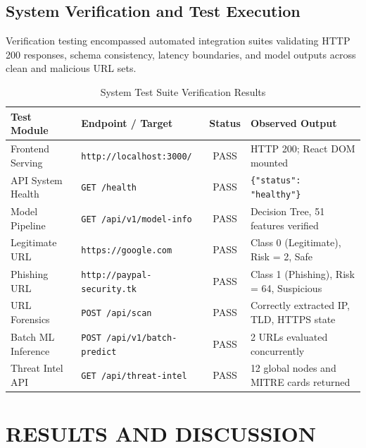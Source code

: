 \documentclass[BTech]{srmuthesis}
\begin{document}
\section{System Verification and Test Execution}
Verification testing encompassed automated integration suites validating HTTP 200 responses, schema consistency, latency boundaries, and model outputs across clean and malicious URL sets.

\begin{table}[htpb]
\centering
\caption{System Test Suite Verification Results}
\label{tab:test_results}
\begin{tabular}{|l|l|c|l|}
\hline
\textbf{Test Module} & \textbf{Endpoint / Target} & \textbf{Status} & \textbf{Observed Output} \\
\hline
Frontend Serving & \texttt{http://localhost:3000/} & PASS & HTTP 200; React DOM mounted \\
\hline
API System Health & \texttt{GET /health} & PASS & \texttt{\{"status": "healthy"\}} \\
\hline
Model Pipeline & \texttt{GET /api/v1/model-info} & PASS & Decision Tree, 51 features verified \\
\hline
Legitimate URL & \texttt{https://google.com} & PASS & Class 0 (Legitimate), Risk = 2, Safe \\
\hline
Phishing URL & \texttt{http://paypal-security.tk} & PASS & Class 1 (Phishing), Risk = 64, Suspicious \\
\hline
URL Forensics & \texttt{POST /api/scan} & PASS & Correctly extracted IP, TLD, HTTPS state \\
\hline
Batch ML Inference & \texttt{POST /api/v1/batch-predict}& PASS & 2 URLs evaluated concurrently \\
\hline
Threat Intel API & \texttt{GET /api/threat-intel} & PASS & 12 global nodes and MITRE cards returned \\
\hline
\end{tabular}
\end{table}

\chapter{RESULTS AND DISCUSSION}
\label{chap:results}
\end{document}

